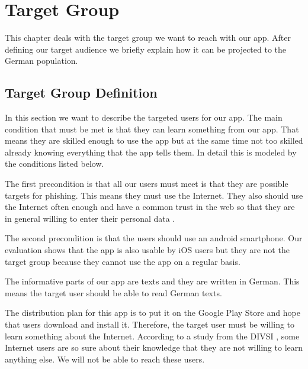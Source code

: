 \section{Target Group}
\label{s:target_group}
This chapter deals with the target group we want to reach with our app.
After defining our target audience we briefly explain how it can be projected to the German population.

\subsection{Target Group Definition}
\label{s:target_group_def}
In this section we want to describe the targeted users for our app.
The main condition that must be met is that they can learn something from our app.
That means they are skilled enough to use the app but at the same time not too skilled already knowing everything that the app tells them.
In detail this is modeled by the conditions listed below.
\begin{description}[leftmargin=0cm]
\item[Attackability] The first precondition is that all our users must meet is that they are possible targets for phishing.
This means they must use the Internet.
They also should use the Internet often enough and have a common trust in the web so that they are in general willing to enter their personal data \cite{divsi2012divsi}.

\item[Android Users] The second precondition is that the users should use an android smartphone.
Our evaluation shows that the app is also usable by iOS users but they are not the target group because they cannot use the app on a regular basis.
\item[Language] The informative parts of our app are texts and they are written in German.
This means the target user should be able to read German texts.
\item[Motivation] The distribution plan for this app is to put it on the Google Play Store and hope that users download and install it.
Therefore, the target user must be willing to learn something about the Internet. According to a study from the DIVSI \cite{divsi2012divsi}, some Internet users are so sure about their knowledge that they are not willing to learn anything else.
We will not be able to reach these users.
\end{description}

